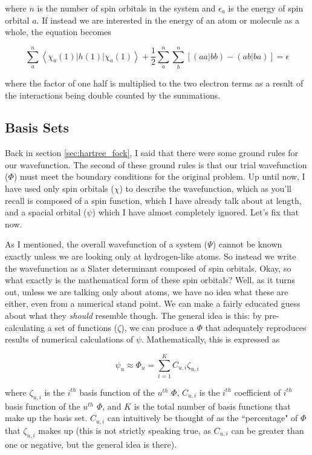 \documentclass[12pt]{report}
\begin{document}
where $n$ is the number of spin orbitals in the system and $\epsilon_{a}$ is the energy of spin orbital $a$. If instead we are interested in the energy of an atom or molecule as a whole, the equation becomes

 \begin{equation}
\label{eq:hartree-fock_eq}
\sum_{a}^{n}\left<\chi_{a}(1)|h(1)|\chi_{a}(1)\right> + \frac{1}{2}\sum^{n}_{a}\sum^{n}_{b}\left[\left(aa|bb\right) - \left(ab|ba\right)\right] = \epsilon
\end{equation}

where the factor of one half is multiplied to the two electron terms as a result of the interactions being double counted by the summations.

\subsection{Basis Sets}
Back in section \ref{sec:hartree_fock}, I said that there were some ground rules for our wavefunction. The second of these ground rules is that our trial wavefunction ($\Phi$) must meet the boundary conditions for the original problem. Up until now, I have used only spin orbitals ($\chi$) to describe the wavefunction, which as you'll recall is composed of a spin function, which I have already talk about at length, and a spacial orbital ($\psi$) which I have almost completely ignored. Let's fix that now. 

As I mentioned, the overall wavefunction of a system ($\Psi$) cannot be known exactly unless we are looking only at hydrogen-like atoms. So instead we write the wavefunction as a Slater determinant composed of spin orbitals. Okay, so what exactly is the mathematical form of these spin orbitals? Well, as it turns out, unless we are talking only about atoms, we have no idea what these are either, even from a numerical stand point. We can make a fairly educated guess about what they \textit{should} resemble though. The general idea is this: by pre-calculating a set of functions ($\zeta$), we can produce a $\Phi$ that adequately reproduces results of numerical calculations of $\psi$. Mathematically, this is expressed as

\begin{equation}
\label{eq:linear_comb_bs}
\psi_{u} \approx \Phi_{u} = \sum^{K}_{i=1}C_{u,i}\zeta_{u,i}
\end{equation}

where $\zeta_{u,i}$ is the $i^{th}$ basis function of the $u^{th}$ $\Phi$, $C_{u,i}$ is the $i^{th}$ coefficient of $i^{th}$ basis function of the $u^{th}$ $\Phi$, and $K$ is the total number of basis functions that make up the basis set. $C_{u,i}$ can intuitively be thought of as the ``percentage" of $\Phi$ that $\zeta_{u,i}$ makes up (this is not strictly speaking true, as $C_{u,i}$ can be greater than one or negative, but the general idea is there).
\end{document}
